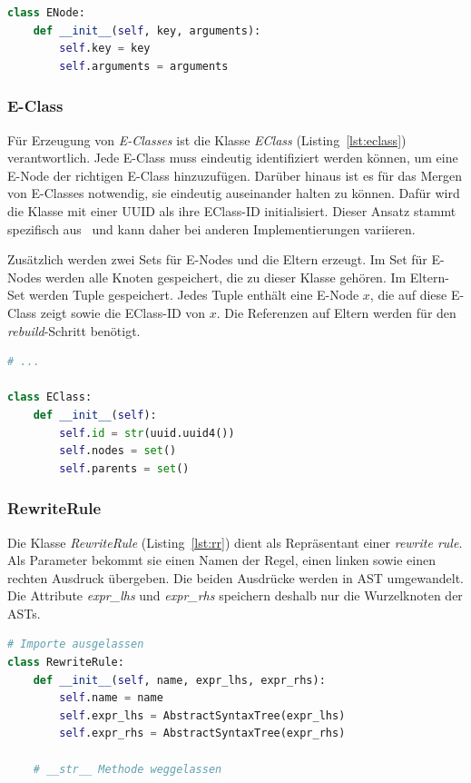 \begin{lstlisting}[language=Python, caption=Klasse \textit{ENode}, label={lst:enode}]
class ENode:
    def __init__(self, key, arguments):
        self.key = key
        self.arguments = arguments
\end{lstlisting}

\subsubsection{E-Class}

Für Erzeugung von \textit{E-Classes} ist die Klasse \textit{EClass} (Listing~\ref{lst:eclass}) verantwortlich. 
Jede E-Class muss eindeutig identifiziert werden können, um eine E-Node der richtigen E-Class hinzuzufügen.
Darüber hinaus ist es für das Mergen von E-Classes notwendig, sie eindeutig auseinander halten zu können.
Dafür wird die Klasse mit einer UUID als ihre EClass-ID initialisiert. Dieser Ansatz stammt spezifisch aus~\cite{2021-egg}
und kann daher bei anderen Implementierungen variieren.

Zusätzlich werden zwei Sets für E-Nodes und die Eltern erzeugt.
Im Set für E-Nodes werden alle Knoten gespeichert, die zu dieser Klasse gehören.
Im Eltern-Set werden Tuple gespeichert. Jedes Tuple enthält eine E-Node $x$, die auf diese E-Class zeigt sowie die EClass-ID von $x$.
Die Referenzen auf Eltern werden für den \textit{rebuild}-Schritt benötigt.

\begin{lstlisting}[language=Python, caption=Klasse \textit{EClass}, label={lst:eclass}]
# ... 

class EClass:
    def __init__(self):
        self.id = str(uuid.uuid4())
        self.nodes = set()
        self.parents = set()
\end{lstlisting}

\subsubsection{RewriteRule}

Die Klasse \textit{RewriteRule} (Listing~\ref{lst:rr}) dient als Repräsentant einer \textit{rewrite rule}. Als Parameter bekommt sie einen Namen der Regel, einen linken sowie einen 
rechten Ausdruck übergeben. Die beiden Ausdrücke werden in AST umgewandelt. Die Attribute \textit{expr\_lhs} und \textit{expr\_rhs} speichern deshalb nur die Wurzelknoten der ASTs.

\begin{lstlisting}[language=Python, caption=Klasse \textit{RewriteRule}, label={lst:rr}]
# Importe ausgelassen 
class RewriteRule:
    def __init__(self, name, expr_lhs, expr_rhs):
        self.name = name
        self.expr_lhs = AbstractSyntaxTree(expr_lhs)
        self.expr_rhs = AbstractSyntaxTree(expr_rhs)

    # __str__ Methode weggelassen 
\end{lstlisting}


